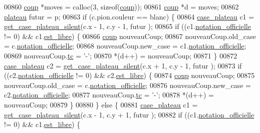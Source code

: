 \begin{DoxyCode}
00860         \hyperlink{structcoup}{coup} *moves = calloc(3, \textcolor{keyword}{sizeof}(\hyperlink{structcoup}{coup}));
00861         \hyperlink{structcoup}{coup} *d = moves;
00862         \hyperlink{structplateau}{plateau} futur = p;
00863         \textcolor{keywordflow}{if} (c.pion.couleur == blanc) \{
00864                 \hyperlink{structcase__plateau}{case_plateau} c1 = \hyperlink{plateau_8h_a60a8f706865d0ae9087f8d65d4667655}{get_case_plateau_silent}(c.x - 1, c.y - 1, futur
      );
00865                 \textcolor{keywordflow}{if} ((c1.\hyperlink{structcase__plateau_ad510581b324604a9cf685cbb769a421a}{notation_officielle} != 0) && c1.\hyperlink{structcase__plateau_a173f25d2fd7c653d77ca8174ba4f636d}{est_libre}) \{
00866                         \hyperlink{structcoup}{coup} nouveauCoup;
00867                         nouveauCoup.old\_case = c.\hyperlink{structcase__plateau_ad510581b324604a9cf685cbb769a421a}{notation_officielle};
00868                         nouveauCoup.new\_case = c1.\hyperlink{structcase__plateau_ad510581b324604a9cf685cbb769a421a}{notation_officielle};
00869                         nouveauCoup.\hyperlink{structcoup_aa33da004dccb192cb33bc00c26c6e859}{tc} = \textcolor{charliteral}{'-'};
00870                         *(d++) = nouveauCoup;
00871                 \}
00872                 \hyperlink{structcase__plateau}{case_plateau} c2 = \hyperlink{plateau_8h_a60a8f706865d0ae9087f8d65d4667655}{get_case_plateau_silent}(c.x + 1, c.y - 1, futur
      );
00873                 \textcolor{keywordflow}{if} ((c2.\hyperlink{structcase__plateau_ad510581b324604a9cf685cbb769a421a}{notation_officielle} != 0) && c2.\hyperlink{structcase__plateau_a173f25d2fd7c653d77ca8174ba4f636d}{est_libre}) \{
00874                         \hyperlink{structcoup}{coup} nouveauCoup;
00875                         nouveauCoup.old\_case = c.\hyperlink{structcase__plateau_ad510581b324604a9cf685cbb769a421a}{notation_officielle};
00876                         nouveauCoup.new\_case = c2.\hyperlink{structcase__plateau_ad510581b324604a9cf685cbb769a421a}{notation_officielle};
00877                         nouveauCoup.\hyperlink{structcoup_aa33da004dccb192cb33bc00c26c6e859}{tc} = \textcolor{charliteral}{'-'};
00878                         *(d++) = nouveauCoup;
00879                 \}
00880         \} \textcolor{keywordflow}{else} \{
00881                 \hyperlink{structcase__plateau}{case_plateau} c1 = \hyperlink{plateau_8h_a60a8f706865d0ae9087f8d65d4667655}{get_case_plateau_silent}(c.x - 1, c.y + 1, futur
      );
00882                 \textcolor{keywordflow}{if} ((c1.\hyperlink{structcase__plateau_ad510581b324604a9cf685cbb769a421a}{notation_officielle} != 0) && c1.\hyperlink{structcase__plateau_a173f25d2fd7c653d77ca8174ba4f636d}{est_libre}) \{

\end{DoxyCode}
